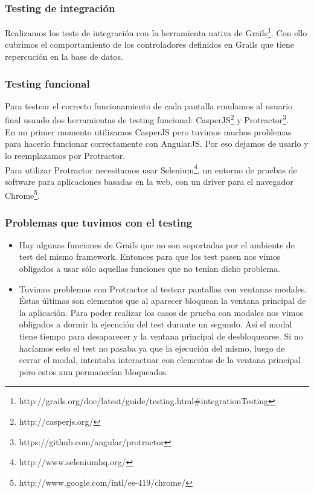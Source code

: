 \subsubsection{Testing de integración}
Realizamos los tests de integración con la herramienta nativa de Grails\footnote{http://grails.org/doc/latest/guide/testing.html\#integrationTesting}. Con ello cubrimos el comportamiento de los controladores definidos en Grails que tiene repercución en la base de datos.

\subsubsection{Testing funcional}
Para testear el correcto funcionamiento de cada pantalla emulamos al usuario final usando dos herramientas de testing funcional: CasperJS\footnote{http://casperjs.org/} y Protractor\footnote{https://github.com/angular/protractor}.\\
En un primer momento utilizamos CasperJS pero tuvimos muchos problemas para hacerlo funcionar correctamente con AngularJS. Por eso dejamos de usarlo y lo reemplazamos por Protractor.\\
Para utilizar Protractor necesitamos usar Selenium\footnote{http://www.seleniumhq.org/}, un entorno de pruebas de software para aplicaciones basadas en la web, con un driver para el navegador  Chrome\footnote{http://www.google.com/intl/es-419/chrome/}.

\subsubsection{Problemas que tuvimos con el testing}
\begin{itemize}
\item Hay algunas funciones de Grails que no son soportadas por el ambiente de test del mismo framework. Entonces para que los test pasen nos vimos obligados a usar sólo aquellas funciones que no tenían dicho problema.
\item Tuvimos problemas con Protractor al testear pantallas con ventanas modales. Éstas últimas son elementos que al aparecer bloquean la ventana principal de la aplicación. Para poder realizar los casos de prueba con modales nos vimos obligados a dormir la ejecución del test durante un segundo. Así el modal tiene tiempo para desaparecer y la ventana principal de desbloquearse. Si no hacíamos esto el test no pasaba ya que la ejecución del mismo, luego de cerrar el modal, intentaba interactuar con elementos de la ventana principal pero estos aun permanecían bloqueados.
\end{itemize}
